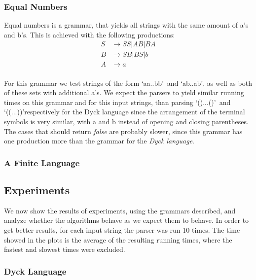 \subsubsection{Equal Numbers}
Equal numbers is a grammar, that yields all strings with the same amount of a's and b's.
This is achieved with the following productions:
\begin{align*}
    S&\rightarrow SS|AB|BA\\
    B&\rightarrow SB|BS|b\\
    A&\rightarrow a\\
\end{align*}

For this grammar we test strings of the form \lq aa..bb\rq~and \lq ab..ab\rq, as well as both of these sets with additional a's.
We expect the parsers to yield similar running times on this grammar and for this input strings, than parsing \lq()...()\rq~and \lq((...))\rq respectively for the Dyck language
since the arrangement of the terminal symbols is very similar, with a and b instead of opening and closing parentheses.
The cases that should return \textit{false} are probably slower, since this grammar has one production more than the grammar for the \textit{Dyck language}.

\subsubsection{A Finite Language}

\subsection{Experiments}
We now show the results of experiments, using the grammars described, and analyze whether the algorithms behave as we expect them to behave.
In order to get better results, for each input string the parser was run 10 times.
The time showed in the plots is the average of the resulting running times, where the fastest and slowest times were excluded.

\subsubsection{Dyck Language}

